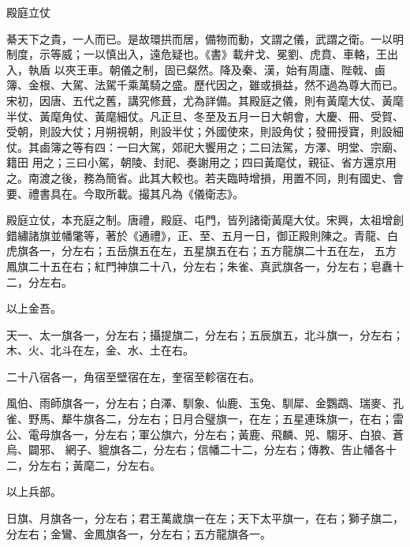 
\begin{pinyinscope}

 殿庭立仗



 綦天下之貴，一人而已。是故環拱而居，備物而動，文謂之儀，武謂之衛。一以明制度，示等威；一以慎出入，遠危疑也。《書》載弁戈、冕劉、虎賁、車輅，王出入，執盾
 以夾王車。朝儀之制，固已粲然。降及秦、漢，始有周廬、陛戟、鹵簿、金根、大駕、法駕千乘萬騎之盛。歷代因之，雖或損益，然不過為尊大而已。宋初，因唐、五代之舊，講究修葺，尤為詳備。其殿庭之儀，則有黃麾大仗、黃麾半仗、黃麾角仗、黃麾細仗。凡正旦、冬至及五月一日大朝會，大慶、冊、受賀、受朝，則設大仗；月朔視朝，則設半仗；外國使來，則設角仗；發冊授寶，則設細仗。其鹵簿之等有四：一曰大駕，郊祀大饗用之；二曰法駕，方澤、明堂、宗廟、籍田
 用之；三曰小駕，朝陵、封祀、奏謝用之；四曰黃麾仗，親征、省方還京用之。南渡之後，務為簡省。此其大較也。若夫臨時增損，用置不同，則有國史、會要、禮書具在。今取所載。撮其凡為《儀衛志》。



 殿庭立仗，本充庭之制。唐禮，殿庭、屯門，皆列諸衛黃麾大仗。宋興，太祖增創錯繡諸旗並幡氅等，著於《通禮》，正、至、五月一日，御正殿則陳之。青龍、白虎旗各一，分左右；五岳旗五在左，五星旗五在右；五方龍旗二十五在左，
 五方鳳旗二十五在右；紅門神旗二十八，分左右；朱雀、真武旗各一，分左右；皂纛十二，分左右。



 以上金吾。



 天一、太一旗各一，分左右；攝提旗二，分左右；五辰旗五，北斗旗一，分左右；木、火、北斗在左，金、水、土在右。



 二十八宿各一，角宿至壁宿在左，奎宿至軫宿在右。



 風伯、雨師旗各一，分左右；白澤、馴象、仙鹿、玉兔、馴犀、金鸚鵡、瑞麥、孔雀、野馬、犛牛旗各二，分左右；日月合璧旗一，在左；五星連珠旗一，在右；雷公、電母旗各一，分左右；軍公旗六，分左右；黃鹿、飛麟、兕、騶牙、白狼、蒼烏、闢邪、
 網子、貔旗各二，分左右；信幡二十二，分左右；傳教、告止幡各十二，分左右；黃麾二，分左右。



 以上兵部。



 日旗、月旗各一，分左右；君王萬歲旗一在左；天下太平旗一，在右；獅子旗二，分左右；金鸞、金鳳旗各一，分左右；五方龍旗各一。




\end{pinyinscope}
